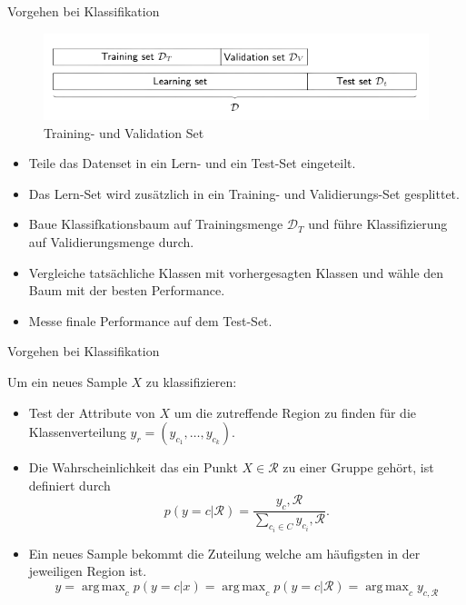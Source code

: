 \documentclass{beamer}
\DeclareMathOperator*{\argmax}{arg\,max}
\begin{document}
\begin{frame}{Vorgehen bei Klassifikation}
	
	\begin{figure}
		\includegraphics[width=\linewidth]{Images/training.png}
		\caption{Training- und Validation Set \cite{machine-learning}}
	\end{figure}
	
	\begin{itemize}
		\item Teile das Datenset in ein Lern- und ein Test-Set eingeteilt.
		\item Das Lern-Set wird zusätzlich in ein Training- und Validierungs-Set gesplittet.
		\item Baue Klassifkationsbaum auf Trainingsmenge $\mathcal{D}_T$ und führe Klassifizierung auf Validierungsmenge durch.
		\item Vergleiche tatsächliche Klassen mit vorhergesagten Klassen und wähle den Baum mit der besten Performance.
		\item Messe finale Performance auf dem Test-Set.
	\end{itemize}

\end{frame}

\begin{frame}{Vorgehen bei Klassifikation}

Um ein neues Sample $X$ zu klassifizieren:
	\begin{itemize}
		\item Test der Attribute von $X$ um die zutreffende Region zu finden für die Klassenverteilung $y_r = (y_{c_1}, \ldots, y_{c_k})$.
		\item Die Wahrscheinlichkeit das ein Punkt $X \in \mathcal{R}$ zu einer Gruppe gehört, ist definiert durch
			\[p(y = c | \mathcal{R}) = \frac{y_c, \mathcal{R}}{\sum_{c_i \in C} y_{c_i}, \mathcal{R}}.\]
		\item Ein neues Sample bekommt die Zuteilung welche am häufigsten in der jeweiligen Region ist.
			\[\hat{y} = \argmax_c p(y = c | x) = \argmax_c p(y = c | \mathcal{R}) = \argmax_c y_{c,\mathcal{R}}\]
	\end{itemize}
\end{frame}
\end{document}

